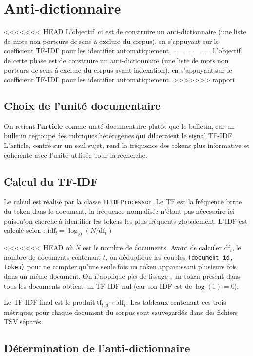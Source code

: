 \chapter{Anti-dictionnaire}

<<<<<<< HEAD
L'objectif ici est de construire un anti-dictionnaire (une liste de mots non porteurs de sens à exclure du corpus), en s'appuyant sur le coefficient TF-IDF pour les identifier automatiquement.
=======
L'objectif de cette phase est de construire un anti-dictionnaire (une liste de mots non porteurs de sens à exclure du corpus avant indexation), en s'appuyant sur le coefficient TF-IDF pour les identifier automatiquement.
>>>>>>> rapport

\section{Choix de l'unité documentaire}

On retient \textbf{l'article} comme unité documentaire plutôt que le bulletin, car un bulletin regroupe des rubriques hétérogènes qui dilueraient le signal TF-IDF. L'article, centré sur un seul sujet, rend la fréquence des tokens plus informative et cohérente avec l'unité utilisée pour la recherche.

\section{Calcul du TF-IDF}

Le calcul est réalisé par la classe \texttt{TFIDFProcessor}. Le TF est la fréquence brute du token dans le document, la fréquence normalisée n'étant pas nécessaire ici puisqu'on cherche à identifier les tokens les plus fréquents globalement. L'IDF est calculé selon : \(\text{idf}_t = \log_{10}\!\left(N/\text{df}_t\right)\)

<<<<<<< HEAD
où $N$ est le nombre de documents. Avant de calculer $\text{df}_t$, le nombre de documents contenant $t$, on déduplique les couples \texttt{(document\_id, token)} pour ne compter qu'une seule fois un token apparaissant plusieurs fois dans un même document. On n'applique pas de lissage : un token présent dans tous les documents obtient un TF-IDF nul (car son IDF est de $\log(1) = 0$).

Le TF-IDF final est le produit $\text{tf}_{t,d} \times \text{idf}_t$. Les tableaux contenant ces trois métriques pour chaque document du corpus sont sauvegardés dans des fichiers TSV séparés.
\section{Détermination de l'anti-dictionnaire}

